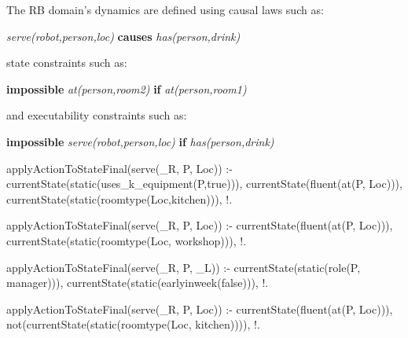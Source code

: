 

The RB domain's dynamics are defined using causal laws such as:

\textit{serve(robot,person,loc)} \textbf{causes} \textit{has(person,drink)}

state constraints such as:

\textbf{impossible} \textit{at(person,room2)} \textbf{if} \textit{at(person,room1)}

and executability constraints such as:

\textbf{impossible} \textit{serve(robot,person,loc)} \textbf{if} \textit{has(person,drink)}



applyActionToStateFinal(serve(_R, P, Loc)) :-
	currentState(static(uses_k_equipment(P,true))),
	currentState(fluent(at(P, Loc))),
	currentState(static(roomtype(Loc,kitchen))),
	!.
	
applyActionToStateFinal(serve(_R, P, Loc)) :-
	currentState(fluent(at(P, Loc))),
	currentState(static(roomtype(Loc, workshop))),
	!.
	
applyActionToStateFinal(serve(_R, P, _L)) :-
	currentState(static(role(P, manager))),
	currentState(static(earlyinweek(false))),
	!.
	
applyActionToStateFinal(serve(_R, P, Loc)) :-
	currentState(fluent(at(P, Loc))),
	not(currentState(static(roomtype(Loc, kitchen)))),
	!.
	
	